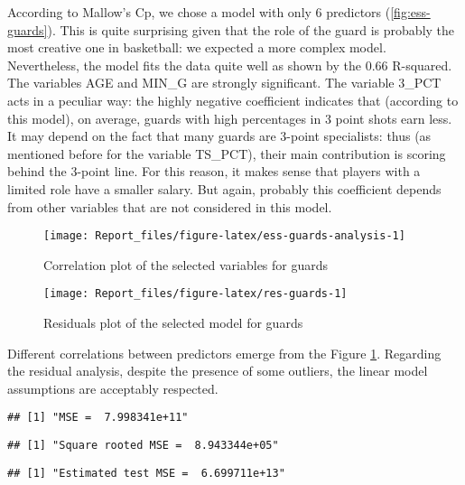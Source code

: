 \documentclass[
]{article}
\begin{document}
According to Mallow's Cp, we chose a model with only 6 predictors
(\ref{fig:ess-guards}). This is quite surprising given that the role of
the guard is probably the most creative one in basketball: we expected a
more complex model. Nevertheless, the model fits the data quite well as
shown by the 0.66 R-squared. The variables AGE and MIN\_G are strongly
significant. The variable 3\_PCT acts in a peculiar way: the highly
negative coefficient indicates that (according to this model), on
average, guards with high percentages in 3 point shots earn less. It may
depend on the fact that many guards are 3-point specialists: thus (as
mentioned before for the variable TS\_PCT), their main contribution is
scoring behind the 3-point line. For this reason, it makes sense that
players with a limited role have a smaller salary. But again, probably
this coefficient depends from other variables that are not considered in
this model.

\begin{figure}

{\centering \texttt{[image: Report\_files/figure-latex/ess-guards-analysis-1]} 

}

\caption{Correlation plot of the selected variables for guards \label{figess-guards-analysis}}\label{fig:ess-guards-analysis}
\end{figure}

\begin{figure}

{\centering \texttt{[image: Report\_files/figure-latex/res-guards-1]} 

}

\caption{Residuals plot of the selected model for guards \label{fig:res-guards}}\label{fig:res-guards}
\end{figure}

Different correlations between predictors emerge from the Figure
\ref{fig:ess-guards-analysis}. Regarding the residual analysis, despite
the presence of some outliers, the linear model assumptions are
acceptably respected.

\begin{verbatim}
## [1] "MSE =  7.998341e+11"
\end{verbatim}

\begin{verbatim}
## [1] "Square rooted MSE =  8.943344e+05"
\end{verbatim}

\begin{verbatim}
## [1] "Estimated test MSE =  6.699711e+13"
\end{verbatim}
\end{document}
